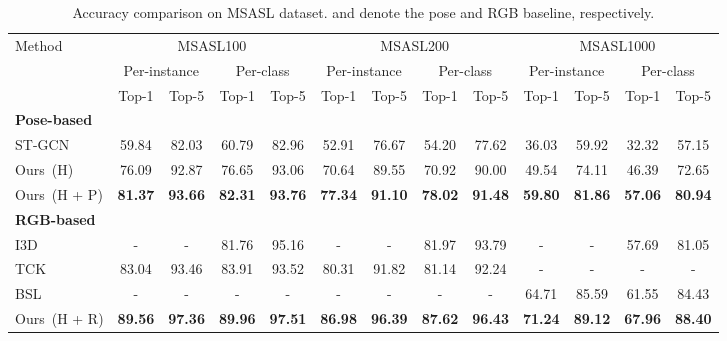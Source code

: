\documentclass[10pt,twocolumn,letterpaper]{article}
\begin{document}
\begin{table*}
\small
\tabcolsep=7pt
\begin{center}
\begin{threeparttable}
\begin{tabular}{l|cc|cc|cc|cc|cc|cc}
\hline
\multirow{3}{*}{Method} & \multicolumn{4}{c|}{MSASL100}
                        & \multicolumn{4}{c|}{MSASL200}
                        & \multicolumn{4}{c}{MSASL1000}\\ \cline{2-13}
        & \multicolumn{2}{c|}{Per-instance} & \multicolumn{2}{c|}{Per-class} 
        & \multicolumn{2}{c|}{Per-instance} & \multicolumn{2}{c|}{Per-class}
        & \multicolumn{2}{c|}{Per-instance} & \multicolumn{2}{c}{Per-class} \\ 
        & Top-1 & Top-5 & Top-1 & Top-5 
        & Top-1 & Top-5 & Top-1 & Top-5 
        & Top-1 & Top-5 & Top-1 & Top-5    \\ \hline \hline
\textbf{Pose-based} & & & & & & & & & & & & \\
ST-GCN~\cite{yan2018spatial}  & 59.84 & 82.03 & 60.79 & 82.96  
        & 52.91 & 76.67 & 54.20 & 77.62
        & 36.03 & 59.92 & 32.32 & 57.15 \\
Ours~(H) & 76.09 & 92.87 & 76.65 & 93.06  
         & 70.64 & 89.55 & 70.92 & 90.00
         & 49.54 & 74.11 & 46.39 & 72.65 \\
Ours~(H + P) & \textbf{81.37} & \textbf{93.66} & \textbf{82.31} & \textbf{93.76} 
             & \textbf{77.34} & \textbf{91.10} & \textbf{78.02} & \textbf{91.48}
             & \textbf{59.80} & \textbf{81.86} & \textbf{57.06} & \textbf{80.94} \\ \hline
\textbf{RGB-based} & & & & & & & & & & & &   \\
I3D~\cite{joze2018ms}  & - & - & 81.76 & 95.16  
        & - & - & 81.97 & 93.79
        & - & - & 57.69 & 81.05 \\ 
TCK~\cite{li2020transfer}  & 83.04 & 93.46 & 83.91 & 93.52  
        & 80.31 & 91.82 & 81.14 & 92.24
        & - & - & - & - \\ 
BSL~\cite{albanie2020bsl}  & - & - & - & -  
        & - & - & - & -
        & 64.71 & 85.59 & 61.55 & 84.43  \\
Ours~(H + R)   & \textbf{89.56} & \textbf{97.36} & \textbf{89.96} & \textbf{97.51}
             & \textbf{86.98} & \textbf{96.39} & \textbf{87.62} & \textbf{96.43}
             & \textbf{71.24} & \textbf{89.12} & \textbf{67.96} & \textbf{88.40} \\ \hline 
\end{tabular}
\end{threeparttable}
\end{center}
\caption{Accuracy comparison on MSASL dataset. \cite{yan2018spatial} and \cite{joze2018ms} denote the pose and RGB baseline, respectively.}
\label{msasl}
\vspace{-0.2cm}
\end{table*}
\end{document}
